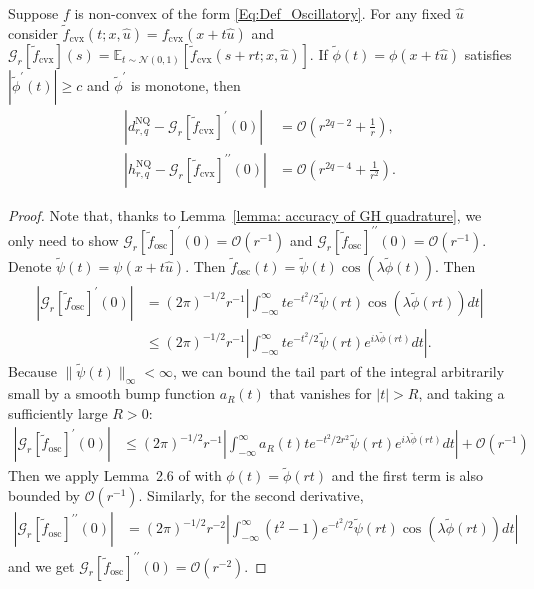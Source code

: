 \begin{theorem}
    \label{thm: CARS-NQ Osc.}
    Suppose $f$ is non-convex of the form \eqref{Eq:Def_Oscillatory}.
    For any fixed $\hat{u}$ consider $\tilde{f}_{\mathrm{cvx}}(t;x,\hat{u}) = f_{\mathrm{cvx}}(x + t\hat{u})$ and $\mathcal{G}_{r}[\tilde{f}_{\mathrm{cvx}}](s) = \mathbb{E}_{t\sim \mathcal{N}(0,1)} [ \tilde{f}_{\mathrm{cvx}}(s+r t;x,\hat{u})]$.
    If $\tilde{\phi}(t) = \phi(x+t\hat{u})$ satisfies $|\tilde{\phi}^{\prime}(t)| \geq c$ and $\tilde{\phi}^{\prime}$ is monotone,
    then
    \begin{align}
        |d^{\mathrm{NQ}}_{r,q} - \mathcal{G}_{r}[\tilde{f}_{\mathrm{cvx}}]^{\prime}(0)|       & = \mathcal{O}(r^{2q-2} + \frac{1}{r}),     \\
        |h^{\mathrm{NQ}}_{r,q} - \mathcal{G}_{r}[\tilde{f}_{\mathrm{cvx}}]^{\prime\prime}(0)| & = \mathcal{O}(r^{2q-4} + \frac{1}{r^2})  .
    \end{align}
\end{theorem}
\begin{proof} Note that, thanks to Lemma~\ref{lemma: accuracy of GH quadrature}, we only need to show
    $\mathcal{G}_r[\tilde{f}_\mathrm{osc}]^{\prime}(0) = \mathcal{O}(r^{-1})$ and
    $ \mathcal{G}_r[\tilde{f}_\mathrm{osc}]^{\prime\prime}(0) = \mathcal{O}(r^{-1})$.
    Denote $\tilde{\psi}(t) = \psi(x + t\hat{u})$. Then  $\tilde{f}_\mathrm{osc}(t) = \tilde{\psi}(t)\cos(\lambda \tilde{\phi}(t))$.
    Then
    \begin{align*}
        \left|\mathcal{G}_r[\tilde{f}_\mathrm{osc}]^{\prime}(0)\right|
         & = (2\pi)^{-1/2} r^{-1} \left|\int_{-\infty}^{\infty} t e^{-t^2/2}\tilde{\psi}(rt)\cos(\lambda \tilde{\phi}(rt)) dt\right| \\
         & \leq (2\pi)^{-1/2} r^{-1} \left|
        \int_{-\infty}^{\infty} t e^{-t^2/2}\tilde{\psi}(rt) e^{i\lambda \tilde{\phi}(rt)} dt\right|.
    \end{align*}
    Because $\|\tilde{\psi}(t)\|_\infty < \infty$, we can bound the tail part of the integral arbitrarily small by a smooth bump function $a_R(t)$ that vanishes for $|t|>R$, and taking a sufficiently large $R>0$:
    \begin{align*}
        \left|\mathcal{G}_r[\tilde{f}_\mathrm{osc}]^{\prime}(0)\right|
         & \leq (2\pi)^{-1/2} r^{-1}\left|\int_{-\infty}^{\infty} a_R(t) t e^{-t^2/2r^2}\tilde{\psi}(rt)e^{i\lambda \tilde{\phi}(rt)} dt\right| + \mathcal{O}(r^{-1})
    \end{align*}
    Then we apply Lemma~2.6 of \cite{Tao247BNotes} with $\phi(t) = \tilde{\phi}(rt)$ and the first term is also bounded by $\mathcal{O}(r^{-1})$.
    Similarly, for the second derivative,
    \begin{align*}
        \left|\mathcal{G}_r[\tilde{f}_\mathrm{osc}]^{\prime\prime}(0)\right|
         & = (2\pi)^{-1/2} r^{-2} \left|\int_{-\infty}^{\infty} (t^2-1) e^{-t^2/2}\tilde{\psi}(rt)\cos(\lambda \tilde{\phi}(rt)) dt\right|
    \end{align*}
    and we get $\mathcal{G}_r[\tilde{f}_\mathrm{osc}]^{\prime\prime}(0) = \mathcal{O}(r^{-2})$.
\end{proof}

